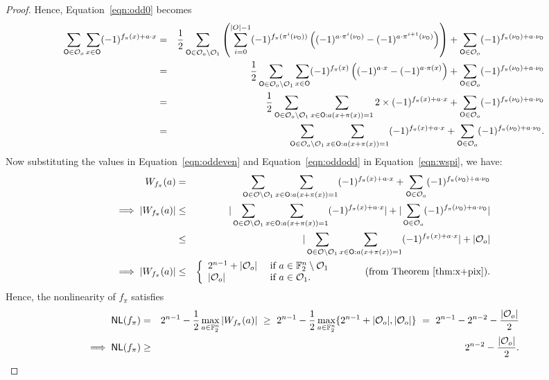 \documentclass{llncs}
\begin{document}
\begin{proof}
Hence, Equation~\ref{eqn:odd0} becomes
\begin{eqnarray}\label{eqn:oddodd}
\sum_{\mathsf{O} \in \mathcal{O}_o} \sum_{x \in \mathsf{O}} (-1)^{ f_\pi(x) + a \cdot x}
& = & \frac{1}{2}\sum_{\mathsf{O} \in \mathcal{O}_o\setminus\mathcal{O}_1} 
\left(\sum_{i=0}^{|O|-1} (-1)^{f_\pi(\pi^i(\nu_{\mathsf{O}}))}
\left((-1)^{a \cdot \pi^i(\nu_{\mathsf{O}})} - (-1)^{a \cdot \pi^{i+1}(\nu_{\mathsf{O}})}\right)\right) + \sum_{\mathsf{O} \in \mathcal{O}_o} (-1)^{ f_\pi(\nu_{\mathsf{O}}) + a \cdot \nu_{\mathsf{O}}} \nonumber \\
& = & \frac{1}{2}\sum_{\mathsf{O} \in \mathcal{O}_o\setminus\mathcal{O}_1} 
\sum_{x \in \mathsf{O}} (-1)^{f_\pi(x)} \left((-1)^{a \cdot x} - (-1)^{a \cdot \pi(x)}\right) + \sum_{\mathsf{O} \in \mathcal{O}_o} (-1)^{ f_\pi(\nu_{\mathsf{O}}) + a \cdot \nu_{\mathsf{O}}} \nonumber \\
& = & \frac{1}{2}\sum_{\mathsf{O} \in \mathcal{O}_o\setminus\mathcal{O}_1} 
\sum_{x \in \mathsf{O} : a(x+\pi(x)) = 1} 2 \times (-1)^{f_\pi(x)+a\cdot x} + \sum_{\mathsf{O} \in \mathcal{O}_o} (-1)^{ f_\pi(\nu_{\mathsf{O}}) + a \cdot \nu_{\mathsf{O}}} \nonumber \\
& = & \sum_{\mathsf{O} \in \mathcal{O}_o\setminus\mathcal{O}_1} 
\sum_{x \in \mathsf{O} : a(x+\pi(x)) = 1} (-1)^{f_\pi(x)+a\cdot x} + \sum_{\mathsf{O} \in \mathcal{O}_o} (-1)^{ f_\pi(\nu_{\mathsf{O}}) + a \cdot \nu_{\mathsf{O}}}.
\end{eqnarray}
Now substituting the values in Equation~\ref{eqn:oddeven} and Equation~\ref{eqn:oddodd} in Equation~\ref{eqn:wspi}, we have:
\begin{eqnarray*}\label{eqn:wspi1}
W_{f_\pi}(a) & =  &
\sum_{\mathsf{O} \in \mathcal{O}\setminus\mathcal{O}_1}\sum_{x \in \mathsf{O}: a(x+\pi(x)) = 1}(-1)^{f_\pi(x)+a\cdot x}+\sum_{\mathsf{O} \in \mathcal{O}_o} (-1)^{ f_\pi(\nu_{\mathsf{O}}) + a \cdot \nu_{\mathsf{O}}} \nonumber \\
\implies |W_{f_\pi}(a)| & \leq  &
|\sum_{\mathsf{O} \in \mathcal{O}\setminus\mathcal{O}_1}\sum_{x \in \mathsf{O}: a(x+\pi(x)) = 1}(-1)^{f_\pi(x)+a\cdot x}|+|\sum_{\mathsf{O} \in \mathcal{O}_o} (-1)^{ f_\pi(\nu_{\mathsf{O}}) + a \cdot \nu_{\mathsf{O}}}|\nonumber \\
& \leq  & |\sum_{\mathsf{O} \in \mathcal{O}\setminus\mathcal{O}_1}\sum_{x \in \mathsf{O}: a(x+\pi(x)) = 1}(-1)^{f_\pi(x)+a\cdot x}|+|\mathcal{O}_o|\nonumber \\
\implies |W_{f_\pi}(a)| & \leq  & \left\{  \begin{array}{ll}
        2^{n-1}+ |\mathcal{O}_o| & \text{ if } a \in \mathbb{F}_2^n \setminus \mathcal{O}_1 \\
        |\mathcal{O}_o|        & \text{ if } a \in \mathcal{O}_1.
    \end{array}   \right.  ~~~~~~~~~\text{(from Theorem~\ref{thm:x+pix})}.
\end{eqnarray*}
Hence, the nonlinearity of $f_\pi$ satisfies
\begin{eqnarray*}
\mathsf{NL}(f_\pi) & = & 2^{n-1}-\frac{1}{2} \max_{a\in \mathbb{F}_2^n}| W_{f_\pi}(a)|
~\geq~ 2^{n-1}-\frac{1}{2} \max_{a\in \mathbb{F}_2^n} \{2^{n-1}+|\mathcal{O}_o|,|\mathcal{O}_o| \} ~=~ 2^{n-1} - 2^{n-2} - \frac{|\mathcal{O}_o|}{2} \\
\implies \mathsf{NL}(f_\pi) & \ge & 2^{n-2} - \frac{|\mathcal{O}_o|}{2}.
\end{eqnarray*}
\end{proof}
\end{document}
